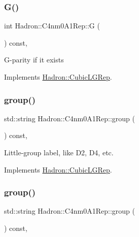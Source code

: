 \subsubsection{\texorpdfstring{G()}{G()}\hspace{0.1cm}{\footnotesize\ttfamily [3/3]}}
{\footnotesize\ttfamily int Hadron\+::\+C4nm0\+A1\+Rep\+::G (\begin{DoxyParamCaption}{ }\end{DoxyParamCaption}) const\hspace{0.3cm}{\ttfamily [inline]}, {\ttfamily [virtual]}}

G-\/parity if it exists 

Implements \mbox{\hyperlink{structHadron_1_1CubicLGRep_ace26f7b2d55e3a668a14cb9026da5231}{Hadron\+::\+Cubic\+L\+G\+Rep}}.

\mbox{\label{structHadron_1_1C4nm0A1Rep_a8a1fbd6d906d95cd3fa74bac06176aaa}} 
\subsubsection{\texorpdfstring{group()}{group()}\hspace{0.1cm}{\footnotesize\ttfamily [1/5]}}
{\footnotesize\ttfamily std\+::string Hadron\+::\+C4nm0\+A1\+Rep\+::group (\begin{DoxyParamCaption}{ }\end{DoxyParamCaption}) const\hspace{0.3cm}{\ttfamily [inline]}, {\ttfamily [virtual]}}

Little-\/group label, like D2, D4, etc. 

Implements \mbox{\hyperlink{structHadron_1_1CubicLGRep_a9bdb14b519a611d21379ed96a3a9eb41}{Hadron\+::\+Cubic\+L\+G\+Rep}}.

\mbox{\label{structHadron_1_1C4nm0A1Rep_a8a1fbd6d906d95cd3fa74bac06176aaa}} 
\subsubsection{\texorpdfstring{group()}{group()}\hspace{0.1cm}{\footnotesize\ttfamily [2/5]}}
{\footnotesize\ttfamily std\+::string Hadron\+::\+C4nm0\+A1\+Rep\+::group (\begin{DoxyParamCaption}{ }\end{DoxyParamCaption}) const\hspace{0.3cm}{\ttfamily [inline]}, {\ttfamily [virtual]}}

